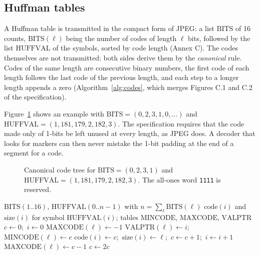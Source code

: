 \subsection{Huffman tables}

A Huffman table is transmitted in the compact form of JPEG: a list $\mathrm{BITS}$ of 16
counts, $\mathrm{BITS}(\ell)$ being the number of codes of length $\ell$ bits, followed by the
list $\mathrm{HUFFVAL}$ of the symbols, sorted by code length (Annex C). The codes themselves
are not transmitted: both sides derive them by the \emph{canonical} rule. Codes of the same
length are consecutive binary numbers, the first code of each length follows the last code of
the previous length, and each step to a longer length appends a zero
(Algorithm~\ref{alg:codes}, which merges Figures C.1 and C.2 of the specification).

Figure~\ref{fig:hufftree} shows an example with $\mathrm{BITS} = (0, 2, 3, 1, 0, \dots)$ and
$\mathrm{HUFFVAL} = (1, 181, 179, 2, 182, 3)$. The specification requires that the code made
only of 1-bits be left unused at every length, as JPEG does. A decoder that looks for markers
can then never mistake the 1-bit padding at the end of a segment for a code.

\begin{figure}[ht]
  \centering
  
  \caption{Canonical code tree for $\mathrm{BITS} = (0,2,3,1)$ and
  $\mathrm{HUFFVAL} = (1, 181, 179, 2, 182, 3)$. The all-ones word \texttt{1111} is reserved.}
  \label{fig:hufftree}
\end{figure}

\begin{algorithm}[ht]
  \caption{Canonical codes and decoding tables from BITS and HUFFVAL.}
  \label{alg:codes}
  \begin{algorithmic}[1]
    \Require $\mathrm{BITS}(1..16)$, $\mathrm{HUFFVAL}(0..n-1)$ with $n = \sum_\ell \mathrm{BITS}(\ell)$
    \Ensure $\mathrm{code}(i)$ and $\mathrm{size}(i)$ for symbol $\mathrm{HUFFVAL}(i)$; tables $\mathrm{MINCODE}$, $\mathrm{MAXCODE}$, $\mathrm{VALPTR}$
    \State $c \gets 0$;\ $i \gets 0$
        \State $\mathrm{MAXCODE}(\ell) \gets -1$ 
      \Else
        \State $\mathrm{VALPTR}(\ell) \gets i$;\ $\mathrm{MINCODE}(\ell) \gets c$
          \State $\mathrm{code}(i) \gets c$;\ $\mathrm{size}(i) \gets \ell$;\ $c \gets c + 1$;\ $i \gets i + 1$
        \EndFor
        \State $\mathrm{MAXCODE}(\ell) \gets c - 1$
      \EndIf
      \State $c \gets 2c$ 
    \EndFor
  \end{algorithmic}
\end{algorithm}

